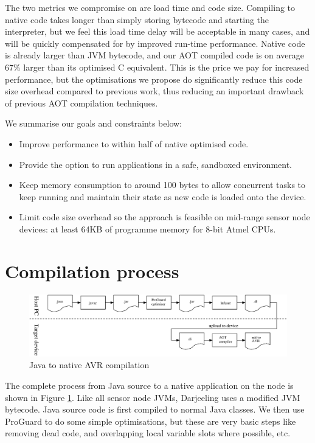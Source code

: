 The two metrics we compromise on are load time and code size. Compiling to native code takes longer than simply storing bytecode and starting the interpreter, but we feel this load time delay will be acceptable in many cases, and will be quickly compensated for by improved run-time performance. Native code is already larger than JVM bytecode, and our AOT compiled code is on average 67\% larger than its optimised C equivalent. This is the price we pay for increased performance, but the optimisations we propose do significantly reduce this code size overhead compared to previous work, thus reducing an important drawback of previous AOT compilation techniques.

We summarise our goals and constraints below:
\begin{itemize}
  \item Improve performance to within half of native optimised code.
  \item Provide the option to run applications in a safe, sandboxed environment.
  \item Keep memory consumption to around 100 bytes to allow concurrent tasks to keep running and maintain their state as new code is loaded onto the device.
  \item Limit code size overhead so the approach is feasible on mid-range sensor node devices: at least 64KB of programme memory for 8-bit Atmel CPUs.
\end{itemize}

\section{Compilation process}
\label{sec-compilation-process}
\begin{figure}
  \includegraphics[width=\linewidth]{compilation-process.eps}
  \caption{Java to native AVR compilation}
  \label{fig-translation-process}
\end{figure}

The complete process from Java source to a native application on the node is shown in Figure \ref{fig-translation-process}. Like all sensor node JVMs, Darjeeling uses a modified JVM bytecode. Java source code is first compiled to normal Java classes. We then use ProGuard \cite{proguard} to do some simple optimisations, but these are very basic steps like removing dead code, and overlapping local variable slots where possible, etc.

